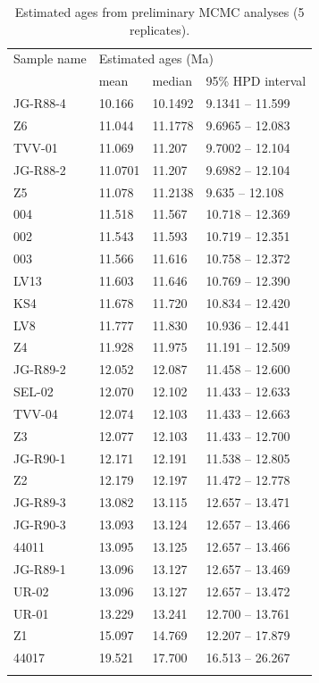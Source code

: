 \documentclass[12pt,letterpaper]{article}
\begin{document}
\renewcommand\baselinestretch{1.2}\selectfont
\begin{longtable}{llll}
\caption{Estimated ages from preliminary MCMC analyses (5 replicates). }\\
\hline
Sample name  &  \multicolumn{3}{l}{Estimated ages (Ma)} \\ 
   &  mean  &  median  &  95\% HPD interval \\ 
\hline
JG-R88-4  &  10.166  &  10.1492  &  9.1341 -- 11.599 \\ 
Z6  &  11.044  &  11.1778  &  9.6965 -- 12.083 \\ 
TVV-01  &  11.069  &  11.207  &  9.7002 -- 12.104 \\ 
JG-R88-2  &  11.0701  &  11.207  &  9.6982 -- 12.104 \\ 
Z5  &  11.078  &  11.2138  &  9.635 -- 12.108 \\ 
004  &  11.518  &  11.567  &  10.718 -- 12.369 \\ 
002  &  11.543  &  11.593  &  10.719 -- 12.351 \\ 
003  &  11.566  &  11.616  &  10.758 -- 12.372 \\ 
LV13  &  11.603  &  11.646  &  10.769 -- 12.390 \\ 
KS4  &  11.678  &  11.720  &  10.834 -- 12.420 \\ 
LV8  &  11.777  &  11.830  &  10.936 -- 12.441 \\ 
Z4  &  11.928  &  11.975  &  11.191 -- 12.509 \\ 
JG-R89-2  &  12.052  &  12.087  &  11.458 -- 12.600 \\ 
SEL-02  &  12.070  &  12.102  &  11.433 -- 12.633 \\ 
TVV-04  &  12.074  &  12.103  &  11.433 -- 12.663 \\ 
Z3  &  12.077  &  12.103  &  11.433 -- 12.700 \\ 
JG-R90-1  &  12.171  &  12.191  &  11.538 -- 12.805 \\ 
Z2  &  12.179  &  12.197  &  11.472 -- 12.778 \\ 
JG-R89-3  &  13.082  &  13.115  &  12.657 -- 13.471 \\ 
JG-R90-3  &  13.093  &  13.124  &  12.657 -- 13.466 \\ 
44011  &  13.095  &  13.125  &  12.657 -- 13.466 \\ 
JG-R89-1  &  13.096  &  13.127  &  12.657 -- 13.469 \\ 
UR-02  &  13.096  &  13.127  &  12.657 -- 13.472 \\ 
UR-01  &  13.229  &  13.241  &  12.700 -- 13.761 \\ 
Z1  &  15.097  &  14.769  &  12.207 -- 17.879 \\ 
44017  &  19.521  &  17.700  &  16.513 -- 26.267 \\
\hline
\label{table_res}	
\end{longtable}
\renewcommand\baselinestretch{1.66}\selectfont
\end{document}
